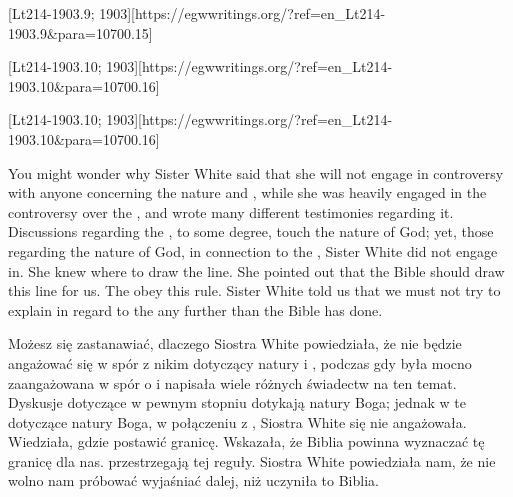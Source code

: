 [Lt214-1903.9; 1903][https://egwwritings.org/?ref=en\_Lt214-1903.9&para=10700.15]


[Lt214-1903.10; 1903][https://egwwritings.org/?ref=en\_Lt214-1903.10&para=10700.16]


[Lt214-1903.10; 1903][https://egwwritings.org/?ref=en\_Lt214-1903.10&para=10700.16]


You might wonder why Sister White said that she will not engage in controversy with anyone concerning the nature and , while she was heavily engaged in the controversy over the , and wrote many different testimonies regarding it. Discussions regarding the , to some degree, touch the nature of God; yet, those regarding the nature of God, in connection to the , Sister White did not engage in. She knew where to draw the line. She pointed out that the Bible should draw this line for us.  The  obey this rule. Sister White told us that we must not try to explain in regard to the  any further than the Bible has done.


Możesz się zastanawiać, dlaczego Siostra White powiedziała, że nie będzie angażować się w spór z nikim dotyczący natury i , podczas gdy była mocno zaangażowana w spór o  i napisała wiele różnych świadectw na ten temat. Dyskusje dotyczące  w pewnym stopniu dotykają natury Boga; jednak w te dotyczące natury Boga, w połączeniu z , Siostra White się nie angażowała. Wiedziała, gdzie postawić granicę. Wskazała, że Biblia powinna wyznaczać tę granicę dla nas.   przestrzegają tej reguły. Siostra White powiedziała nam, że nie wolno nam próbować wyjaśniać  dalej, niż uczyniła to Biblia.


